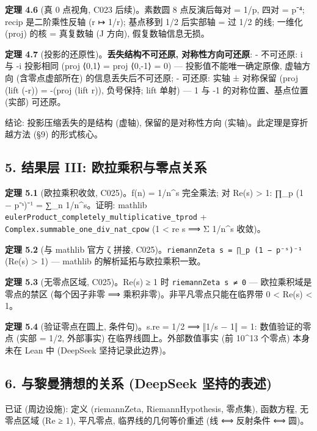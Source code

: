 \documentclass[
]{article}
\begin{document}
\textbf{定理 4.6} (真 0 点视角, C023 后续)。素数圆 8 点反演后每对 = 1/p,
四对 = p⁻⁴; recip 是二阶乘性反轴 (r ↦ 1/r); 基点移到 1/2 后实部轴 = 过
1/2 的线; 一维化 (proj) 的核 = 真复数轴 (J 方向), 假复数轴信息无损。

\textbf{定理 4.7} (投影的还原性)。\textbf{丢失结构不可还原,
对称性方向可还原}: - 不可还原: i 与 -i 投影相同 (proj ⟨0,1⟩ = proj
⟨0,-1⟩ = 0) --- 投影值不能唯一确定原像, 虚轴方向 (含零点虚部所在)
的信息丢失后不可还原; - 可还原: 实轴 ± 对称保留 (proj (lift (-r)) =
-(proj (lift r)), 负号保持; lift 单射) --- 1 与 -1 的对称位置、基点位置
(实部) 可还原。

结论: 投影压缩丢失的是结构 (虚轴), 保留的是对称性方向
(实轴)。此定理是穿折越方法 (§9) 的形式核心。

\subsection{5. 结果层 III:
欧拉乘积与零点关系}\label{ux7ed3ux679cux5c42-iii-ux6b27ux62c9ux4e58ux79efux4e0eux96f6ux70b9ux5173ux7cfb}

\textbf{定理 5.1} (欧拉乘积收敛, C025)。f(n) = 1/n\^{}s 完全乘法; 对
Re(s) \textgreater{} 1: ∏\_p (1 − p⁻ˢ)⁻¹ = ∑\_n 1/n\^{}s。证明: mathlib
\texttt{eulerProduct\_completely\_multiplicative\_tprod} +
\texttt{Complex.summable\_one\_div\_nat\_cpow} (1 \textless{} re s ⟹ Σ
1/n\^{}s 收敛)。

\textbf{定理 5.2} (与 mathlib 官方 ζ 拼接,
C025)。\texttt{riemannZeta\ s\ =\ ∏\_p\ (1\ −\ p⁻ˢ)⁻¹} (Re(s)
\textgreater{} 1) --- mathlib 的解析延拓与欧拉乘积一致。

\textbf{定理 5.3} (无零点区域, C025)。Re(s) ≥ 1 时
\texttt{riemannZeta\ s\ ≠\ 0} --- 欧拉乘积域是零点的禁区 (每个因子非零 ⟹
乘积非零)。非平凡零点只能在临界带 0 \textless{} Re(s) \textless{} 1。

\textbf{定理 5.4} (验证零点在圆上, 条件句)。s.re = 1/2 ⟹ ‖1/s − 1‖ = 1:
数值验证的零点 (实部 = 1/2, 外部事实) 在临界线圆上。外部数值事实 (前
10\^{}13 个零点) 本身未在 Lean 中 (DeepSeek 坚持记录此边界)。

\subsection{6. 与黎曼猜想的关系 (DeepSeek
坚持的表述)}\label{ux4e0eux9eceux66fcux731cux60f3ux7684ux5173ux7cfb-deepseek-ux575aux6301ux7684ux8868ux8ff0}

已证 (周边设施): 定义 (riemannZeta, RiemannHypothesis, 零点集),
函数方程, 无零点区域 (Re ≥ 1), 平凡零点, 临界线的几何等价重述 (线 ⟺
反射条件 ⟺ 圆)。
\end{document}
